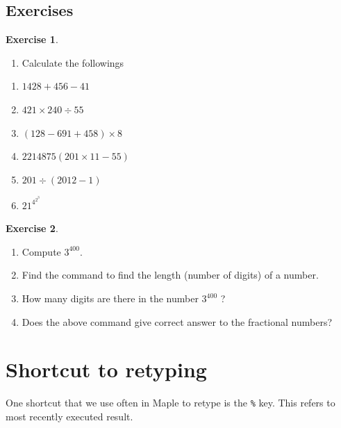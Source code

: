\documentclass[
]{book}
\providecommand{\tightlist}{%
  \setlength{\itemsep}{0pt}\setlength{\parskip}{0pt}}
\theoremstyle{definition}
\theoremstyle{definition}
\theoremstyle{definition}
\newtheorem{exercise}{Exercise}[chapter]
\theoremstyle{definition}
\theoremstyle{remark}
\begin{document}
\subsection{Exercises}\label{exercises-2}

\begin{exercise}
\protect\hypertarget{exr:unnamed-chunk-62}{}\label{exr:unnamed-chunk-62}\leavevmode

\begin{enumerate}
\def\labelenumi{\arabic{enumi}.}
\tightlist
\item
  Calculate the followings
\end{enumerate}

\begin{enumerate}
\def\labelenumi{\roman{enumi}.}
\tightlist
\item
  \(1428 + 456 − 41\)
\item
  \(421 × 240 ÷ 55\)
\item
  \((128 − 691 + 458) × 8\)
\item
  \(2214875(201 × 11 − 55)\)
\item
  \(201 ÷ (2012 − 1)\)
\item
  \(21^{4^{2^3}}\)
\end{enumerate}

\end{exercise}

\begin{exercise}
\protect\hypertarget{exr:unnamed-chunk-63}{}\label{exr:unnamed-chunk-63}\leavevmode

\begin{enumerate}
\def\labelenumi{\roman{enumi}.}
\tightlist
\item
  Compute \(3^{400}\).
\item
  Find the command to find the length (number of digits) of a number.
\item
  How many digits are there in the number \(3^{400}\) ?
\item
  Does the above command give correct answer to the fractional numbers?
\end{enumerate}

\end{exercise}

\section{Shortcut to retyping}\label{shortcut-to-retyping-1}

One shortcut that we use often in Maple to retype is the \texttt{\%} key. This refers to most recently executed result.
\end{document}
